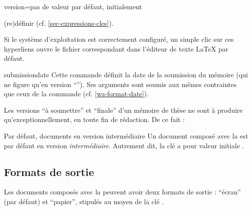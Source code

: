 {\begin{docKey}{version}{=\textbar{}\textbar{}\textbar{}\textbar{}\textbar{}}{pas
      de valeur par défaut, initialement }
\begin{description}
\begin{itemize}
\begin{enumerate}
\begin{enumerate}
\begin{itemize}
              (re)définir (cf. \vref{sec-expressions-cles}).
            \end{itemize}
          \end{enumerate}
          Si le système d'exploitation est correctement configuré, un simple
          clic sur ces hyperliens ouvre le fichier correspondant dans l'éditeur
          de texte \LaTeX{} par défaut.
        \end{enumerate}
      \end{itemize}
    \end{description}
  \end{docKey}
}

\begin{docCommand}{submissiondate}{}
  Cette commande définit la date de la soumission du mémoire (qui ne figure
  qu'en version \enquote{}). Ses arguments sont soumis aux
  mêmes contraintes que ceux de la commande 
  (cf. \vref{wa-format-date}).
\end{docCommand}

Les versions \enquote{à soumettre} et \enquote{finale} d'un mémoire de thèse ne
sont à produire qu'exceptionnellement, en toute fin de rédaction. De ce fait :
\begin{dbwarning}{Par défaut, documents en version intermédiaire}{}
  Un document composé avec la \yatCl{} est par défaut en version
  \emph{intermédiaire}. Autrement dit, la clé  a pour valeur
  initiale .
\end{dbwarning}

\subsection{Formats de sortie}
\label{sec-formats-de-sortie}

Les documents composés avec la \yatCl{} peuvent avoir deux formats de sortie :
\enquote{écran} (par défaut) et \enquote{papier}, stipulés au moyen de la clé
.

